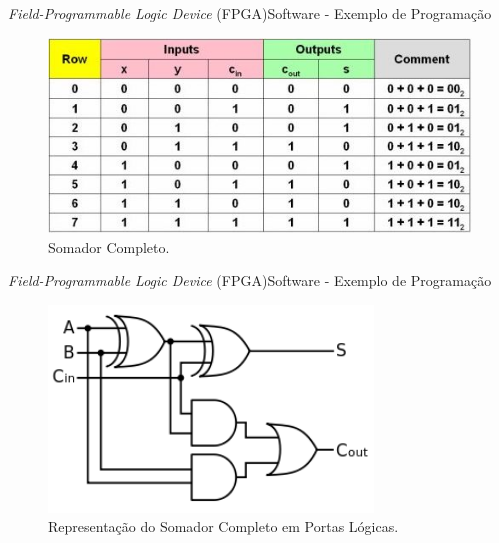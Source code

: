     	\begin{frame}{\textit{Field-Programmable Logic Device} (FPGA)}{Software - Exemplo de Programação}
    		\begin{figure}[p]
    			\centering
    			\includegraphics[width=1\textwidth]{img/fpga/adder-table.jpg}
    			\caption{Somador Completo.}
    			\label{fig:somador_completo}
    		\end{figure}
    	\end{frame}
    
    	\begin{frame}{\textit{Field-Programmable Logic Device} (FPGA)}{Software - Exemplo de Programação}
    		\begin{figure}[p]
    			\centering
    			\includegraphics[width=0.77\textwidth]{img/fpga/adder.png}
    			\caption{Representação do Somador Completo em Portas Lógicas.}
    			\label{fig:somador_completo_pl}
    		\end{figure}
    	\end{frame}
    
